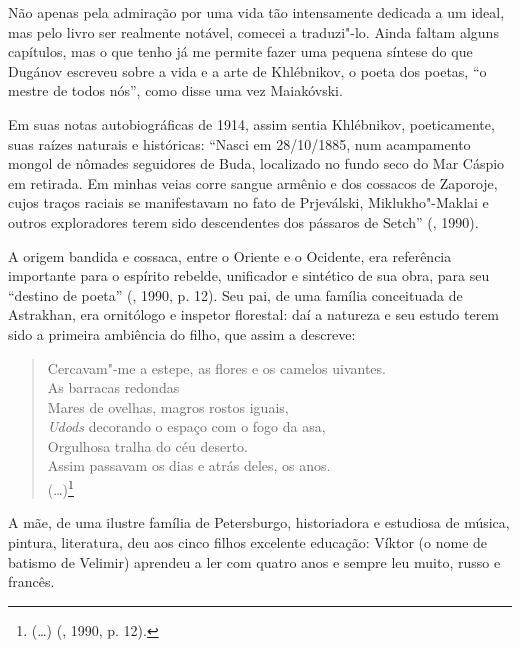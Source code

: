 Não apenas pela admiração por uma vida tão intensamente dedicada a um
ideal, mas pelo livro ser realmente notável, comecei a traduzi"-lo.
Ainda faltam alguns capítulos, mas o que tenho já me
permite fazer uma pequena síntese do que Dugánov escreveu sobre a
vida e a arte de Khlébnikov, o poeta dos poetas, ``o mestre de
todos nós'', como disse uma vez Maiakóvski.

Em suas notas autobiográficas de 1914, assim sentia Khlébnikov,
poeticamente, suas raízes naturais e históricas: ``Nasci em 28/10/1885,
num acampamento mongol de nômades seguidores de Buda, localizado no
fundo seco do Mar Cáspio em retirada. Em minhas veias corre sangue
armênio e dos cossacos de Zaporoje, cujos traços raciais se manifestavam
no fato de Prjeválski, Miklukho"-Maklai e outros exploradores terem sido
descendentes dos pássaros de Setch'' (, 1990).

A origem bandida e cossaca, entre o Oriente e o Ocidente,
era referência importante para o espírito rebelde, unificador e
sintético de sua obra, para seu ``destino de poeta'' (, 1990, p. 12). Seu pai, de uma
família conceituada de Astrakhan, era ornitólogo e inspetor florestal:
daí a natureza e seu estudo terem sido a primeira ambiência do filho,
que assim a descreve:

\begin{verse}
Cercavam"-me a estepe, as flores e os \qb{}camelos uivantes. \\
As barracas redondas \\
Mares de ovelhas, magros rostos iguais, \\
\emph{Udods} decorando o espaço com o fogo da \qb{}asa, \\
Orgulhosa tralha do céu deserto. \\
Assim passavam os dias e atrás deles, os anos. \\
(\ldots{})\footnote{{} (\ldots{}) (, 1990, p. 12).}
\end{verse}

A mãe, de uma ilustre família de Petersburgo, historiadora e estudiosa
de música, pintura, literatura, deu aos cinco filhos excelente educação:
Víktor (o nome de batismo de Velimir) aprendeu a ler com quatro
anos e sempre leu muito, russo e francês.

